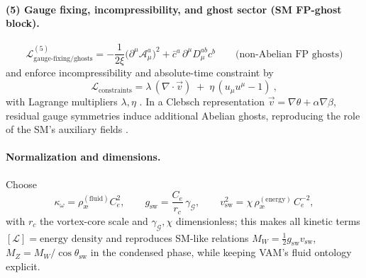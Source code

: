\documentclass[11pt]{article}
\begin{document}
    \paragraph{(5) Gauge fixing, incompressibility, and ghost sector (SM FP-ghost block).}
    \[
        \boxed{\ \mathcal{L}^{(5)}_{\text{gauge-fixing/ghosts}}=
            -\frac{1}{2\xi}\big(\partial^\mu \mathcal{A}_\mu^a\big)^2
            +\bar{c}^a\,\partial^\mu D_\mu^{ab} c^b
            \qquad\text{(non-Abelian FP ghosts)}\ }
    \]
    and enforce incompressibility and absolute-time constraint by
    \[
        \boxed{\ \mathcal{L}_\text{constraints}=\lambda\,(\nabla\!\cdot\!\vec v)\;+\; \eta\,(u_\mu u^\mu-1)\ ,\ }
    \]
    with Lagrange multipliers \(\lambda,\eta\) \cite{Iskandarani2025EmergentGR,Iskandarani2025TimeDilation}.
    In a Clebsch representation \( \vec v=\nabla \theta + \alpha \nabla \beta \), residual gauge symmetries induce additional Abelian ghosts, reproducing the role of the SM’s auxiliary fields \cite{Iskandarani2025TopLag}.

    \paragraph{Normalization and dimensions.}
    Choose
    \[
        \kappa_\omega=\rho_\text{\ae}^{(\text{fluid})} C_e^2,\qquad
        g_\text{sw}=\frac{C_e}{r_c}\,\gamma_\mathcal{G},\qquad
        v_\text{sw}^2=\chi\,\rho_\text{\ae}^{(\text{energy})}\, C_e^{-2},
    \]
    with \(r_c\) the vortex-core scale and \(\gamma_\mathcal{G},\chi\) dimensionless; this makes all kinetic terms \([\mathcal{L}]=\text{energy density}\) and reproduces SM-like relations \(M_W=\tfrac{1}{2}g_\text{sw}v_\text{sw}\), \(M_Z=M_W/\cos\theta_\text{sw}\) in the condensed phase, while keeping VAM’s fluid ontology explicit.
\end{document}
